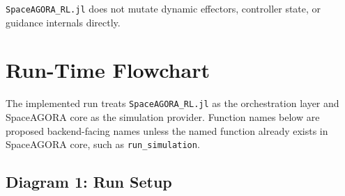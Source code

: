 \documentclass[11pt]{article}
\begin{document}
\texttt{SpaceAGORA\_RL.jl} does not mutate dynamic effectors, controller state, or guidance internals directly.


\section{Run-Time Flowchart}

The implemented run treats \texttt{SpaceAGORA\_RL.jl} as the orchestration layer and SpaceAGORA core as the simulation provider. Function names below are proposed backend-facing names unless the named function already exists in SpaceAGORA core, such as \texttt{run\_simulation}.


\subsection{Diagram 1: Run Setup}
\end{document}
